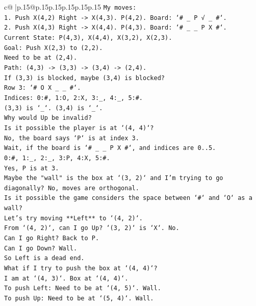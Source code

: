 \documentclass{article}
\begin{document}
{\begin{supertabular}{c@{$\;$}|p{.15\linewidth}@{}p{.15\linewidth}p{.15\linewidth}p{.15\linewidth}p{.15\linewidth}p{.15\linewidth}}
{{{\texttt{My moves:} \\
\texttt{1. Push X(4,2) Right {-}> X(4,3). P(4,2). Board: `\# \_ P √ \_ \#`.} \\
\texttt{2. Push X(4,3) Right {-}> X(4,4). P(4,3). Board: `\# \_ \_ P X \#`.} \\
\texttt{Current State: P(4,3), X(4,4), X(3,2), X(2,3).} \\
\texttt{Goal: Push X(2,3) to (2,2).} \\
\texttt{Need to be at (2,4).} \\
\texttt{Path: (4,3) {-}> (3,3) {-}> (3,4) {-}> (2,4).} \\
\texttt{If (3,3) is blocked, maybe (3,4) is blocked?} \\
\texttt{Row 3: `\# O X \_ \_ \#`.} \\
\texttt{Indices: 0:\#, 1:O, 2:X, 3:\_, 4:\_, 5:\#.} \\
\texttt{(3,3) is `\_`. (3,4) is `\_`.} \\
\texttt{Why would Up be invalid?} \\
\texttt{Is it possible the player is at `(4, 4)`?} \\
\texttt{No, the board says `P` is at index 3.} \\
\texttt{Wait, if the board is `\# \_ \_ P X \#`, and indices are 0..5.} \\
\texttt{0:\#, 1:\_, 2:\_, 3:P, 4:X, 5:\#.} \\
\texttt{Yes, P is at 3.} \\
\texttt{Maybe the "wall" is the box at `(3, 2)` and I'm trying to go diagonally? No, moves are orthogonal.} \\
\texttt{Is it possible the game considers the space between `\#` and `O` as a wall?} \\
\texttt{Let's try moving **Left** to `(4, 2)`.} \\
\texttt{From `(4, 2)`, can I go Up? `(3, 2)` is `X`. No.} \\
\texttt{Can I go Right? Back to P.} \\
\texttt{Can I go Down? Wall.} \\
\texttt{So Left is a dead end.} \\
\texttt{What if I try to push the box at `(4, 4)`?} \\
\texttt{I am at `(4, 3)`. Box at `(4, 4)`.} \\
\texttt{To push Left: Need to be at `(4, 5)`. Wall.} \\
\texttt{To push Up: Need to be at `(5, 4)`. Wall.} \\
}}}
\end{supertabular}}
\end{document}
